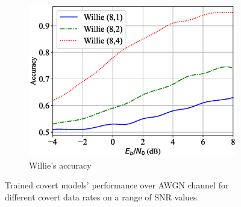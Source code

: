 \begin{figure}[tp!]
\begin{subfigure}{0.28\textwidth}
		\includegraphics[width=\linewidth]{figs/willie_accuracy_awgn}
		\caption{Willie's accuracy}	
		\label{fig:awgn_resutls_willie}
	\end{subfigure}
	\caption{Trained covert models' performance over AWGN channel for different covert data rates on a range of SNR values.}
	\label{fig:awgn_results}
\end{figure}
